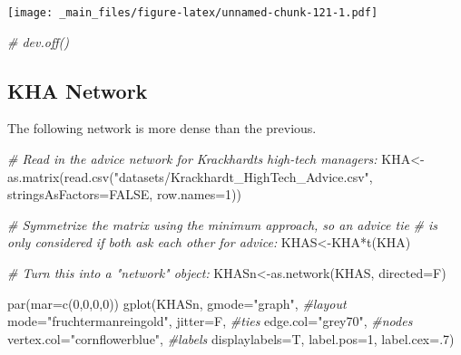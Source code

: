 \documentclass[
  notitlepage,
  onecolumn,
  openany]{book}
\newenvironment{Shaded}{\begin{snugshade}}{\end{snugshade}}
\newcommand{\AttributeTok}[1]{\textcolor[rgb]{0.77,0.63,0.00}{#1}}
\newcommand{\CommentTok}[1]{\textcolor[rgb]{0.56,0.35,0.01}{\textit{#1}}}
\newcommand{\ConstantTok}[1]{\textcolor[rgb]{0.00,0.00,0.00}{#1}}
\newcommand{\DecValTok}[1]{\textcolor[rgb]{0.00,0.00,0.81}{#1}}
\newcommand{\FunctionTok}[1]{\textcolor[rgb]{0.00,0.00,0.00}{#1}}
\newcommand{\NormalTok}[1]{#1}
\newcommand{\OtherTok}[1]{\textcolor[rgb]{0.56,0.35,0.01}{#1}}
\newcommand{\SpecialCharTok}[1]{\textcolor[rgb]{0.00,0.00,0.00}{#1}}
\newcommand{\StringTok}[1]{\textcolor[rgb]{0.31,0.60,0.02}{#1}}
\begin{document}
\texttt{[image: \_main\_files/figure-latex/unnamed-chunk-121-1.pdf]}

\begin{Shaded}
\begin{Highlighting}[]
\CommentTok{\# dev.off()}
\end{Highlighting}
\end{Shaded}

\hypertarget{kha-network}{%
\subsection{KHA Network}\label{kha-network}}

The following network is more dense than the previous.

\begin{Shaded}
\begin{Highlighting}[]
\CommentTok{\# Read in the advice network for Krackhardt\textquotesingle{}s high{-}tech managers:}
\NormalTok{KHA}\OtherTok{\textless{}{-}}\FunctionTok{as.matrix}\NormalTok{(}\FunctionTok{read.csv}\NormalTok{(}\StringTok{"datasets/Krackhardt\_HighTech\_Advice.csv"}\NormalTok{,}
                        \AttributeTok{stringsAsFactors=}\ConstantTok{FALSE}\NormalTok{, }\AttributeTok{row.names=}\DecValTok{1}\NormalTok{))}

\CommentTok{\# Symmetrize the matrix using the minimum approach, so an advice tie}
\CommentTok{\# is only considered if both ask each other for advice:}
\NormalTok{KHAS}\OtherTok{\textless{}{-}}\NormalTok{KHA}\SpecialCharTok{*}\FunctionTok{t}\NormalTok{(KHA)}

\CommentTok{\# Turn this into a "network" object:}
\NormalTok{KHASn}\OtherTok{\textless{}{-}}\FunctionTok{as.network}\NormalTok{(KHAS, }\AttributeTok{directed=}\NormalTok{F)}

\FunctionTok{par}\NormalTok{(}\AttributeTok{mar=}\FunctionTok{c}\NormalTok{(}\DecValTok{0}\NormalTok{,}\DecValTok{0}\NormalTok{,}\DecValTok{0}\NormalTok{,}\DecValTok{0}\NormalTok{))}
\FunctionTok{gplot}\NormalTok{(KHASn, }
      \AttributeTok{gmode=}\StringTok{"graph"}\NormalTok{,}
      \CommentTok{\#layout}
      \AttributeTok{mode=}\StringTok{"fruchtermanreingold"}\NormalTok{,}
      \AttributeTok{jitter=}\NormalTok{F,}
      \CommentTok{\#ties}
      \AttributeTok{edge.col=}\StringTok{"grey70"}\NormalTok{,}
      \CommentTok{\#nodes}
      \AttributeTok{vertex.col=}\StringTok{"cornflowerblue"}\NormalTok{,}
      \CommentTok{\#labels}
      \AttributeTok{displaylabels=}\NormalTok{T,}
      \AttributeTok{label.pos=}\DecValTok{1}\NormalTok{,}
      \AttributeTok{label.cex=}\NormalTok{.}\DecValTok{7}\NormalTok{)}
\end{Highlighting}
\end{Shaded}
\end{document}
